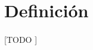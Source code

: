 \documentclass{article}
\begin{document}
	\maketitle
  \thispagestyle{empty}

  \section{Definición}
  \label{sec:definition}

    \paragraph{}
    [TODO ]

	\nocite{muest2017}

  
  
\end{document}
